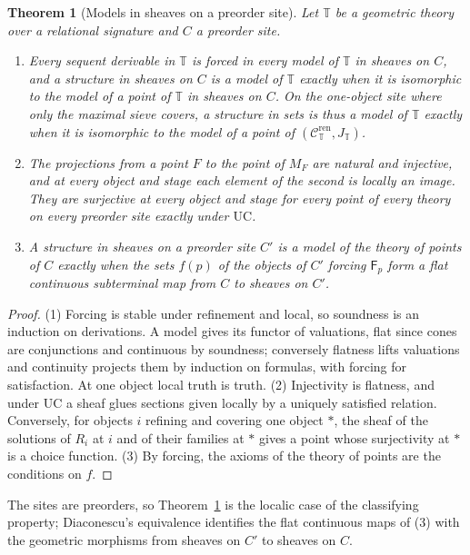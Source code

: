\documentclass{lmcs}
\newtheorem{theorem}{Theorem}[section]
\theoremstyle{definition}
\theoremstyle{remark}
\newcommand{\Tt}{\mathbb{T}}
\newcommand{\prin}[1]{\mathrm{#1}}
\newcommand{\UC}{\prin{UC}}
\newcommand{\Csyn}[1]{\mathcal{C}^{\mathrm{ren}}_{#1}}
\newcommand{\Jsyn}[1]{J_{#1}}
\newcommand{\MF}[1]{M_{#1}}
\newcommand{\fat}[1]{\mathsf{F}_{#1}}
\begin{document}
\begin{theorem}[Models in sheaves on a preorder site]\label{thm:classifying}
Let $\Tt$ be a geometric theory over a relational signature and $C$ a preorder site.
\begin{enumerate}
\item Every sequent derivable in $\Tt$ is forced in every model of $\Tt$ in sheaves on $C$,
  and a structure in sheaves on $C$ is a model of $\Tt$ exactly when it is isomorphic to the model of a point of
  $\Tt$ in sheaves on $C$. On the one-object site where only the maximal sieve
  covers, a structure in sets is thus a model of $\Tt$ exactly when it is isomorphic to the model of a point of
  $(\Csyn{\Tt},\Jsyn{\Tt})$.
\item The projections from a point $F$ to the point of $\MF{F}$ are natural and injective, and at every object
  and stage each element of the second is locally an image. They are surjective at every
  object and stage for every point of every theory on every preorder site exactly under
  $\UC$.
\item A structure in sheaves on a preorder site $C'$ is a model of the theory of points of $C$ exactly when the
  sets $f(p)$ of the objects of $C'$ forcing $\fat{p}$ form a flat continuous subterminal map from $C$ to sheaves on
  $C'$.
\end{enumerate}
\end{theorem}

\begin{proof}
(1) Forcing is stable under refinement and local, so soundness is an induction on
derivations. A model gives its functor of
valuations, flat since cones are conjunctions and continuous by soundness; conversely flatness lifts valuations and
continuity projects them by induction on formulas, with forcing for
satisfaction.
At one object local truth is truth.
(2) Injectivity is flatness, and under $\UC$ a sheaf glues sections given locally by a
uniquely satisfied relation. Conversely, for
objects $i$ refining and covering one object $\ast$, the sheaf of the solutions of $R_i$ at $i$ and of their
families at $\ast$ gives a point whose surjectivity at $\ast$ is a choice
function.
(3) By forcing, the axioms of the theory of points are the conditions on $f$.
\end{proof}

The sites are preorders, so Theorem~\ref{thm:classifying} is the localic case of the classifying property;
Diaconescu's equivalence \cite{Diaconescu75,CL25a} identifies the flat
continuous maps of (3) with the geometric morphisms from sheaves on $C'$ to sheaves on $C$.
\end{document}
